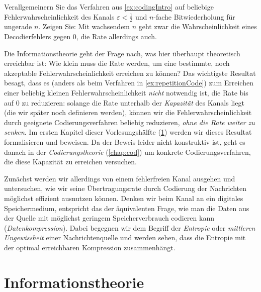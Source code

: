 \begin{exercise}\label{ex:repetitionCode}
Verallgemeinern Sie das Verfahren aus \cref{ex:codingIntro} auf beliebige Fehlerwahrscheinlichkeit des Kanals $ε<\frac12$ und $n$-fache Bitwiederholung für ungerade $n$. Zeigen Sie: Mit wachsendem $n$ geht zwar die Wahrscheinlichkeit eines Decodierfehlers gegen $0$, die Rate allerdings auch.
\end{exercise}

Die Informationstheorie geht der Frage nach, was hier überhaupt theoretisch erreichbar ist: Wie klein muss die Rate werden, um eine bestimmte, noch akzeptable Fehlerwahrscheinlichkeit erreichen zu können? Das wichtigste Resultat besagt, dass es (anders als beim Verfahren in \cref{ex:repetitionCode}) zum Erreichen einer beliebig kleinen Fehlerwahrscheinlichkeit \emph{nicht} notwendig ist, die Rate bis auf $0$ zu reduzieren: solange die Rate unterhalb der \emph{Kapazität} des Kanals liegt (die wir später noch definieren werden), können wir die Fehlerwahrscheinlichkeit durch geeignete Codierungsverfahren beliebig reduzieren, \emph{ohne die Rate weiter zu senken}. Im ersten Kapitel dieser Vorlesungshälfte (\cref{chap:IT}) werden wir dieses Resultat formalisieren und beweisen. Da der Beweis leider nicht konstruktiv ist, geht es danach in der \emph{Codierungstheorie} (\cref{chap:cod}) um konkrete Codierungsverfahren, die diese Kapazität zu erreichen versuchen.

Zunächst werden wir allerdings von einem fehlerfreien Kanal ausgehen und untersuchen, wie wir seine Übertragungsrate durch Codierung der Nachrichten möglichst effizient ausnutzen können. Denken wir beim Kanal an ein digitales Speichermedium, entspricht das der äquivalenten Frage, wie man die Daten aus der Quelle mit möglichst geringem Speicherverbrauch codieren kann (\emph{Datenkompression}). Dabei begegnen wir dem Begriff der \emph{Entropie} oder \emph{mittleren Ungewissheit} einer Nachrichtenquelle und werden sehen, dass die Entropie mit der optimal erreichbaren Kompression zusammenhängt.

\chapter{Informationstheorie}\label{chap:IT}
